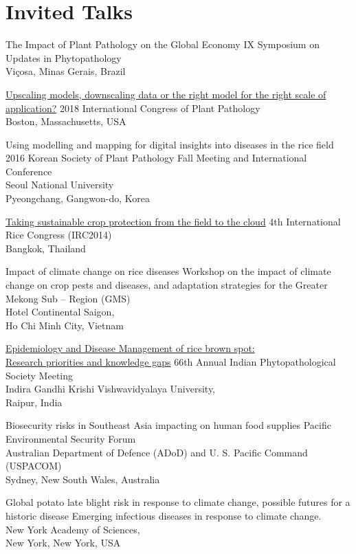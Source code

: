 \section*{Invited Talks}
\begin{entrylist}
  {The Impact of Plant Pathology on the Global Economy}
  {}
  {IX Symposium on Updates in Phytopathology\\Viçosa, Minas Gerais, Brazil}

  {\href{https://www.apsnet.org/publications/Webinars/Pages/2018videos.aspx?LID=Paper4005.mp4}{Upscaling models, downscaling data or the right model for the right scale of application?}}
  {}
  {2018 International Congress of Plant Pathology\\Boston, Massachusetts, USA}

 	{Using modelling and mapping for digital insights into diseases in the rice field}
 	{}
 	{2016 Korean Society of Plant Pathology Fall Meeting and International Conference\\Seoul National University\\Pyeongchang, Gangwon-do, Korea}

	{\href{http://figshare.com/articles/Taking_Sustainable_Crop_Protection_From_the_Field_to_the_Cloud/1225800}{Taking sustainable crop protection from the field to the cloud}}
	{}
	{4th International Rice Congress (IRC2014)\\Bangkok, Thailand}

	{Impact of climate change on rice diseases}
	{}
	{Workshop on the impact of climate change on crop pests and diseases, and adaptation strategies for the Greater Mekong Sub -- Region (GMS)\\Hotel Continental Saigon,\\Ho Chi Minh City, Vietnam}

	{\href{http://figshare.com/articles/IPS_2014/1037569}{Epidemiology and Disease Management of rice brown spot:\\Research priorities and knowledge gaps}}
	{}
	{66th Annual Indian Phytopathological Society Meeting\\Indira Gandhi Krishi Vishwavidyalaya University,\\Raipur, India}

	{Biosecurity risks in Southeast Asia impacting on human food supplies}
	{}
	{Pacific Environmental Security Forum\\Australian Department of Defence (ADoD) and U. S. Pacific Command (USPACOM)\\Sydney, New South Wales, Australia}

	{Global potato late blight risk in response to climate change, possible futures for a historic disease}
  	{}
  	{Emerging infectious diseases in response to climate change.\\New York Academy of Sciences,\\New York, New York, USA}
\end{entrylist}
